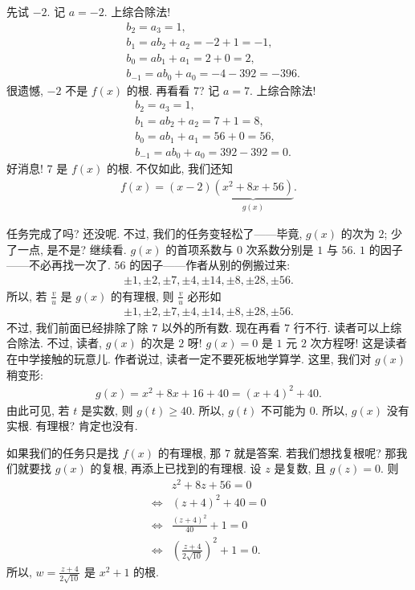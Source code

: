 \begin{example}
    先试 $-2$. 记 $a = -2$. 上综合除法!
    \begin{align*}
         & b_2 = a_3 = 1,                          \\
         & b_1 = a b_2 + a_2 = -2 + 1 = -1,        \\
         & b_0 = a b_1 + a_1 = 2 + 0 = 2,          \\
         & b_{-1} = a b_0 + a_0 = -4 - 392 = -396.
    \end{align*}
    很遗憾, $-2$ 不是 $f(x)$ 的根. 再看看 $7$? 记 $a = 7$. 上综合除法!
    \begin{align*}
         & b_2 = a_3 = 1,                        \\
         & b_1 = a b_2 + a_2 = 7 + 1 = 8,        \\
         & b_0 = a b_1 + a_1 = 56 + 0 = 56,      \\
         & b_{-1} = a b_0 + a_0 = 392 - 392 = 0.
    \end{align*}
    好消息! $7$ 是 $f(x)$ 的根. 不仅如此, 我们还知
    \begin{align*}
        f(x) = (x - 2)\underbrace{(x^2 + 8x + 56)}_{g(x)}.
    \end{align*}

    任务完成了吗? 还没呢. 不过, 我们的任务变轻松了——毕竟, $g(x)$ 的次为 $2$; 少了一点, 是不是? 继续看. $g(x)$ 的首项系数与 $0$ 次系数分别是 $1$ 与 $56$. $1$ 的因子——不必再找一次了. $56$ 的因子——作者从别的例搬过来:
    \begin{align*}
        \pm 1, \pm 2, \pm 7, \pm 4, \pm 14, \pm 8, \pm 28, \pm 56.
    \end{align*}
    所以, 若 $\frac{v}{u}$ 是 $g(x)$ 的有理根, 则 $\frac{v}{u}$ 必形如
    \begin{align*}
        \pm 1, \pm 2, \pm 7, \pm 4, \pm 14, \pm 8, \pm 28, \pm 56.
    \end{align*}
    不过, 我们前面已经排除了除 $7$ 以外的所有数. 现在再看 $7$ 行不行. 读者可以上综合除法. 不过, 读者, $g(x)$ 的次是 $2$ 呀! $g(x) = 0$ 是 $1$ 元 $2$ 次方程呀! 这是读者在中学接触的玩意儿. 作者说过, 读者一定不要死板地学算学. 这里, 我们对 $g(x)$ 稍变形:
    \begin{align*}
        g(x) = x^2 + 8x + 16 + 40 = (x + 4)^2 + 40.
    \end{align*}
    由此可见, 若 $t$ 是实数, 则 $g(t) \geq 40$. 所以, $g(t)$ 不可能为 $0$. 所以, $g(x)$ 没有实根. 有理根? 肯定也没有.

    如果我们的任务只是找 $f(x)$ 的有理根, 那 $7$ 就是答案. 若我们想找复根呢? 那我们就要找 $g(x)$ 的复根, 再添上已找到的有理根. 设 $z$ 是复数, 且 $g(z) = 0$. 则
    \begin{align*}
                & z^2 + 8z + 56 = 0                                  \\
        \iff {} & (z + 4)^2 + 40 = 0                                 \\
        \iff {} & \frac{(z + 4)^2}{40} + 1 = 0                       \\
        \iff {} & \left( \frac{z + 4}{2\sqrt{10}} \right)^2 + 1 = 0.
    \end{align*}
    所以, $w = \frac{z + 4}{2\sqrt{10}}$ 是 $x^2 + 1$ 的根.


\end{example}
